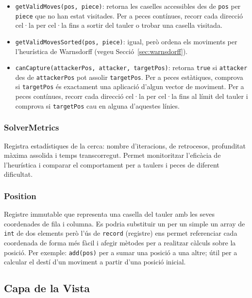 \documentclass[conference,compsoc]{IEEEtran}
\begin{document}
\begin{itemize}
    \item \texttt{getValidMoves(pos, piece)}: retorna les caselles
          accessibles des de \texttt{pos} per \texttt{piece} que no
          han estat visitades. Per a peces contínues, recorr cada
          direcció cel·la per cel·la fins a sortir del tauler o trobar
          una casella visitada.
    \item \texttt{getValidMovesSorted(pos, piece)}: igual, però
          ordena els moviments per l'heurística de Warnsdorff
          (vegeu Secció~\ref{sec:warnsdorff}).
    \item \texttt{canCapture(attackerPos, attacker, targetPos)}: retorna
          \texttt{true} si \texttt{attacker} des de \texttt{attackerPos}
          pot assolir \texttt{targetPos}. Per a peces estàtiques,
          comprova si \texttt{targetPos} és exactament una aplicació
          d'algun vector de moviment. Per a peces contínues, recorr
          cada direcció cel·la per cel·la fins al límit del tauler i
          comprova si \texttt{targetPos} cau en alguna d'aquestes línies.
\end{itemize}

\subsubsection{SolverMetrics}

Registra estadístiques de la cerca: nombre d'iteracions, de retrocesos,
profunditat màxima assolida i temps transcorregut. Permet
monitoritzar l'eficàcia de l'heurística i comparar el comportament
per a taulers i peces de diferent dificultat.

\subsubsection{Position}

Registre immutable que representa una casella
del tauler amb les seves coordenades de fila i columna.
Es podria substituir un per un simple un array de \texttt{int} de dos
elements però l'ús de \texttt{record} (registre) ens permet referenciar
cada coordenada de forma més fàcil i afegir mètodes per a realitzar càlculs
sobre la posició. Per exemple: \texttt{add(pos)} per a sumar una posició a 
una altre; útil per a calcular el destí d'un moviment a partir d'una posició inicial.

\subsection{Capa de la Vista}
\end{document}
